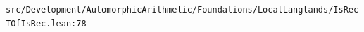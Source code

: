 \nolinkurl{src/Development/AutomorphicArithmetic/Foundations/LocalLanglands/IsRecTOfIsRec.lean:78}%
